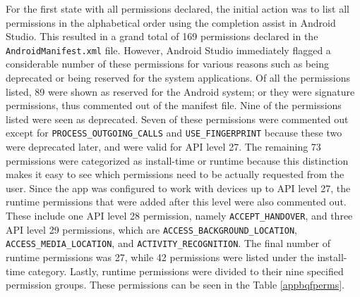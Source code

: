 \documentclass[
  a4paper,  %
  twoside,  %
  bibliography=totoc,
  headsepline,
  cleardoublepage=empty,
  parskip=half,
  draft=false,
  open=any
]{scrbook}
\begin{document}
For the first state with all permissions declared, the initial action was to list all permissions in the alphabetical order using the completion assist in Android Studio. This resulted in a grand total of 169 permissions declared in the \texttt{AndroidManifest.xml} file. However, Android Studio immediately flagged a considerable number of these permissions for various reasons such as being deprecated or being reserved for the system applications. Of all the permissions listed, 89 were shown as reserved for the Android system; or they were signature permissions, thus commented out of the manifest file. Nine of the permissions listed were seen as deprecated. Seven of these permissions were commented out except for \texttt{PROCESS\_OUTGOING\_CALLS} and \texttt{USE\_FINGERPRINT} because these two were deprecated later, and were valid for API level 27. The remaining 73 permissions were categorized as install-time or runtime because this distinction makes it easy to see which permissions need to be actually requested from the user. Since the app was configured to work with devices up to API level 27, the runtime permissions that were added after this level were also commented out. These include one API level 28 permission, namely \texttt{ACCEPT\_HANDOVER}, and three API level 29 permissions, which are \texttt{ACCESS\_BACKGROUND\_LOCATION}, \texttt{ACCESS\_MEDIA\_LOCATION}, and \texttt{ACTIVITY\_RECOGNITION}. The final number of runtime permissions was 27, while 42 permissions were listed under the install-time category. Lastly, runtime permissions were divided to their nine specified permission groups. These permissions can be seen in the Table \ref{appbqfperms}.
\end{document}
